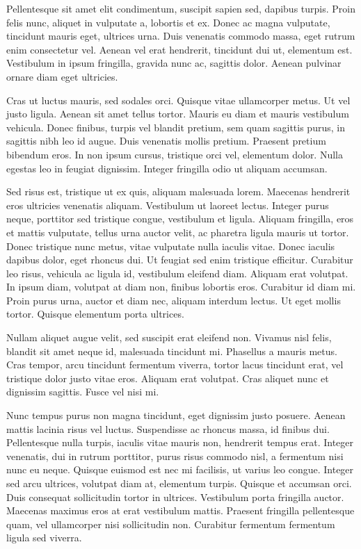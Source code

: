 Pellentesque sit amet elit condimentum, suscipit sapien sed, dapibus turpis. Proin felis nunc, aliquet in vulputate a, lobortis et ex. Donec ac magna vulputate, tincidunt mauris eget, ultrices urna. Duis venenatis commodo massa, eget rutrum enim consectetur vel. Aenean vel erat hendrerit, tincidunt dui ut, elementum est. Vestibulum in ipsum fringilla, gravida nunc ac, sagittis dolor. Aenean pulvinar ornare diam eget ultricies.

Cras ut luctus mauris, sed sodales orci. Quisque vitae ullamcorper metus. Ut vel justo ligula. Aenean sit amet tellus tortor. Mauris eu diam et mauris vestibulum vehicula. Donec finibus, turpis vel blandit pretium, sem quam sagittis purus, in sagittis nibh leo id augue. Duis venenatis mollis pretium. Praesent pretium bibendum eros. In non ipsum cursus, tristique orci vel, elementum dolor. Nulla egestas leo in feugiat dignissim. Integer fringilla odio ut aliquam accumsan.

Sed risus est, tristique ut ex quis, aliquam malesuada lorem. Maecenas hendrerit eros ultricies venenatis aliquam. Vestibulum ut laoreet lectus. Integer purus neque, porttitor sed tristique congue, vestibulum et ligula. Aliquam fringilla, eros et mattis vulputate, tellus urna auctor velit, ac pharetra ligula mauris ut tortor. Donec tristique nunc metus, vitae vulputate nulla iaculis vitae. Donec iaculis dapibus dolor, eget rhoncus dui. Ut feugiat sed enim tristique efficitur. Curabitur leo risus, vehicula ac ligula id, vestibulum eleifend diam. Aliquam erat volutpat. In ipsum diam, volutpat at diam non, finibus lobortis eros. Curabitur id diam mi. Proin purus urna, auctor et diam nec, aliquam interdum lectus. Ut eget mollis tortor. Quisque elementum porta ultrices.

Nullam aliquet augue velit, sed suscipit erat eleifend non. Vivamus nisl felis, blandit sit amet neque id, malesuada tincidunt mi. Phasellus a mauris metus. Cras tempor, arcu tincidunt fermentum viverra, tortor lacus tincidunt erat, vel tristique dolor justo vitae eros. Aliquam erat volutpat. Cras aliquet nunc et dignissim sagittis. Fusce vel nisi mi.

Nunc tempus purus non magna tincidunt, eget dignissim justo posuere. Aenean mattis lacinia risus vel luctus. Suspendisse ac rhoncus massa, id finibus dui. Pellentesque nulla turpis, iaculis vitae mauris non, hendrerit tempus erat. Integer venenatis, dui in rutrum porttitor, purus risus commodo nisl, a fermentum nisi nunc eu neque. Quisque euismod est nec mi facilisis, ut varius leo congue. Integer sed arcu ultrices, volutpat diam at, elementum turpis. Quisque et accumsan orci. Duis consequat sollicitudin tortor in ultrices. Vestibulum porta fringilla auctor. Maecenas maximus eros at erat vestibulum mattis. Praesent fringilla pellentesque quam, vel ullamcorper nisi sollicitudin non. Curabitur fermentum fermentum ligula sed viverra.

